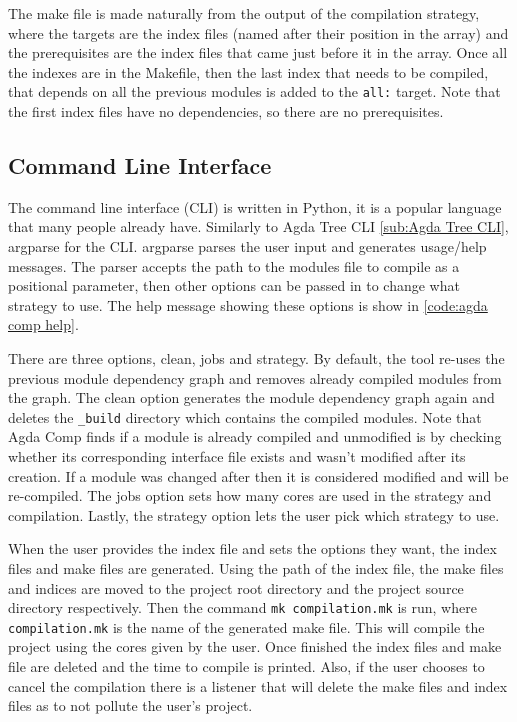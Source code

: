 The make file is made naturally from the output of the compilation strategy,
where the targets are the index files (named after their position in the array)
and the prerequisites are the index files that came just before it in the
array. Once all the indexes are in the Makefile, then the last index that needs
to be compiled, that depends on all the previous modules is added to the
\texttt{all:} target. Note that the first index files have no dependencies, so
there are no prerequisites.


\subsection{Command Line Interface}

The command line interface (CLI) is written in Python, it is a popular language
that many people already have. Similarly to Agda Tree CLI \cref{sub:Agda Tree
CLI}, argparse for the CLI. argparse parses the user input and generates
usage/help messages. The parser accepts the path to the modules file to compile
as a positional parameter, then other options can be passed in to change what
strategy to use. The help message showing these options is show in
\cref{code:agda comp help}.

There are three options, clean, jobs and strategy. By default, the tool re-uses
the previous module dependency graph and removes already compiled modules from
the graph. The clean option generates the module dependency graph again and
deletes the \texttt{\_build} directory which contains the compiled modules.
Note that Agda Comp finds if a module is already compiled and unmodified is by
checking whether its corresponding interface file exists and wasn't modified
after its creation. If a module was changed after then it is considered
modified and will be re-compiled. The jobs option sets how many cores are used
in the strategy and compilation. Lastly, the strategy option lets the user pick
which strategy to use.

When the user provides the index file and sets the options they want, the index
files and make files are generated. Using the path of the index file, the make
files and indices are moved to the project root directory and the project
source directory respectively. Then the command \texttt{mk compilation.mk} is
run, where \texttt{compilation.mk} is the name of the generated make file. This
will compile the project using the cores given by the user. Once finished the
index files and make file are deleted and the time to compile is printed. Also,
if the user chooses to cancel the compilation there is a listener that will
delete the make files and index files as to not pollute the user's project.

